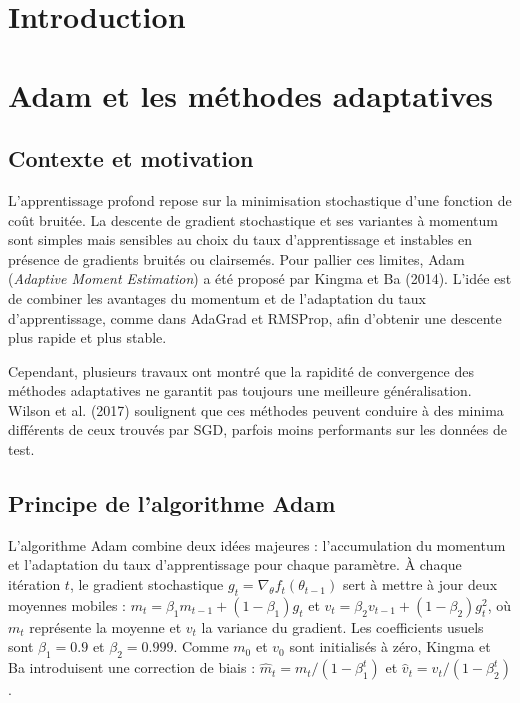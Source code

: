 \documentclass[a4paper,12pt]{article}
\begin{document}
\newpage
\tableofcontents
\newpage



\section{Introduction}

\section{Adam et les méthodes adaptatives}

\subsection{Contexte et motivation}

L'apprentissage profond repose sur la minimisation stochastique d'une fonction de coût
bruitée. La descente de gradient stochastique et ses variantes à momentum sont simples
mais sensibles au choix du taux d'apprentissage et instables en présence de gradients bruités
ou clairsemés. Pour pallier ces limites, Adam (\emph{Adaptive Moment Estimation}) a été
proposé par Kingma et Ba (2014). L'idée est de combiner les avantages du momentum et de
l'adaptation du taux d'apprentissage, comme dans AdaGrad et RMSProp, afin d'obtenir une
descente plus rapide et plus stable.

Cependant, plusieurs travaux ont montré que la rapidité de convergence des méthodes
adaptatives ne garantit pas toujours une meilleure généralisation. Wilson et al. (2017)
soulignent que ces méthodes peuvent conduire à des minima différents de ceux trouvés par
SGD, parfois moins performants sur les données de test.

\subsection{Principe de l’algorithme Adam}

L’algorithme Adam combine deux idées
majeures : l’accumulation du momentum et l’adaptation du taux
d’apprentissage pour chaque paramètre. À chaque itération $t$, le gradient stochastique
$g_t = \nabla_\theta f_t(\theta_{t-1})$ sert à mettre à jour deux
moyennes mobiles :
$m_t = \beta_1 m_{t-1} + (1-\beta_1) g_t$ et
$v_t = \beta_2 v_{t-1} + (1-\beta_2) g_t^2$,
où $m_t$ représente la moyenne et $v_t$ la variance du gradient. Les coefficients usuels sont
$\beta_1=0.9$ et $\beta_2=0.999$. Comme $m_0$ et $v_0$ sont initialisés
à zéro, Kingma et Ba introduisent une correction de biais :
$\hat{m}_t = m_t/(1-\beta_1^t)$ et
$\hat{v}_t = v_t/(1-\beta_2^t)$.
\end{document}
